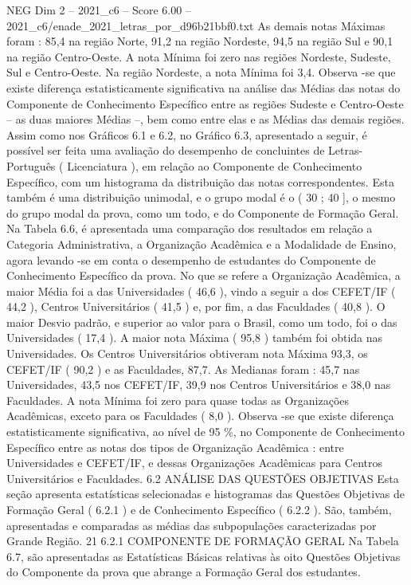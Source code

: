 \begin{textsample}{NEG Dim 2 – 2021\_c6 – Score 6.00 – 2021\_c6/enade\_2021\_letras\_por\_d96b21bbf0.txt}
As demais notas Máximas foram : 85,4 na região Norte, 91,2 na região Nordeste, 94,5 na região Sul e 90,1 na região Centro-Oeste.
A nota Mínima foi zero nas regiões Nordeste, Sudeste, Sul e Centro-Oeste.
Na região Nordeste, a nota Mínima foi 3,4.
Observa -se que existe diferença estatisticamente significativa na análise das Médias das notas do Componente de Conhecimento Específico entre as regiões Sudeste e Centro-Oeste – as duas maiores Médias –, bem como entre elas e as Médias das demais regiões.
Assim como nos Gráficos 6.1 e 6.2, no Gráfico 6.3, apresentado a seguir, é possível ser feita uma avaliação do desempenho de concluintes de Letras-Português ( Licenciatura ), em relação ao Componente de Conhecimento Específico, com um histograma da distribuição das notas correspondentes.
Esta também é uma distribuição unimodal, e o grupo modal é o ( 30 ; 40 ], o mesmo do grupo modal da prova, como um todo, e do Componente de Formação Geral.
Na Tabela 6.6, é apresentada uma comparação dos resultados em relação a Categoria Administrativa, a Organização Acadêmica e a Modalidade de Ensino, agora levando -se em conta o desempenho de estudantes do Componente de Conhecimento Específico da prova.
No que se refere a Organização Acadêmica, a maior Média foi a das Universidades ( 46,6 ), vindo a seguir a dos CEFET/IF ( 44,2 ), Centros Universitários ( 41,5 ) e, por fim, a das Faculdades ( 40,8 ).
O maior Desvio padrão, e superior ao valor para o Brasil, como um todo, foi o das Universidades ( 17,4 ).
A maior nota Máxima ( 95,8 ) também foi obtida nas Universidades.
Os Centros Universitários obtiveram nota Máxima 93,3, os CEFET/IF ( 90,2 ) e as Faculdades, 87,7.
As Medianas foram : 45,7 nas Universidades, 43,5 nos CEFET/IF, 39,9 nos Centros Universitários e 38,0 nas Faculdades.
A nota Mínima foi zero para quase todas as Organizações Acadêmicas, exceto para os Faculdades ( 8,0 ).
Observa -se que existe diferença estatisticamente significativa, ao nível de 95 \%, no Componente de Conhecimento Específico entre as notas dos tipos de Organização Acadêmica : entre Universidades e CEFET/IF, e dessas Organizações Acadêmicas para Centros Universitários e Faculdades. 6.2 ANÁLISE DAS QUESTÕES OBJETIVAS Esta seção apresenta estatísticas selecionadas e histogramas das Questões Objetivas de Formação Geral ( 6.2.1 ) e de Conhecimento Específico ( 6.2.2 ).
São, também, apresentadas e comparadas as médias das subpopulações caracterizadas por Grande Região. 21 6.2.1 COMPONENTE DE FORMAÇÃO GERAL Na Tabela 6.7, são apresentadas as Estatísticas Básicas relativas às oito Questões Objetivas do Componente da prova que abrange a Formação Geral dos estudantes.

\end{textsample}
